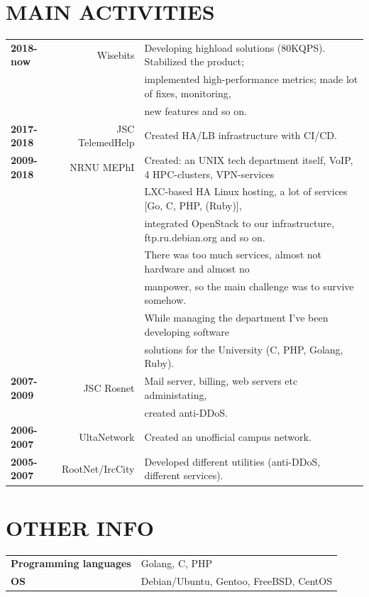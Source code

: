 \begin{resume}
\section{MAIN ACTIVITIES}
\vspace{0.1in} 
\begin{tabular}{lrl}
    {\bf 2018-now}  & Wisebits        & Developing highload solutions (80KQPS). Stabilized the product;\\
                    &                 & implemented high-performance metrics; made lot of fixes, monitoring,\\
                    &                 & new features and so on.\\
    {\bf 2017-2018} & JSC TelemedHelp & Created HA/LB infrastructure with CI/CD.\\
    {\bf 2009-2018} & NRNU MEPhI      & Created: an UNIX tech department itself, VoIP, 4 HPC-clusters, VPN-services\\
                    &                 & LXC-based HA Linux hosting, a lot of services [Go, C, PHP, (Ruby)],\\
                    &                 & integrated OpenStack to our infrastructure, ftp.ru.debian.org and so on.\\
                    &                 & There was too much services, almost not hardware and almost no\\
                    &                 & manpower, so the main challenge was to survive somehow.\\
                    &                 & While managing the department I've been developing software\\
                    &                 & solutions for the University (C, PHP, Golang, Ruby).\\
    {\bf 2007-2009} & JSC Rosnet      & Mail server, billing, web servers etc administating,\\
                    &                 & created anti-DDoS.\\
    {\bf 2006-2007} & UltaNetwork     & Created an unofficial campus network.\\
    {\bf 2005-2007} & RootNet/IrcCity & Developed different utilities (anti-DDoS, different services).\\
\end{tabular}

\section{OTHER INFO}
\vspace{0.1in} 
\begin{tabular}{ll}
{\bf Programming languages} & Golang, C, PHP\\
{\bf OS}                    & Debian/Ubuntu, Gentoo, FreeBSD, CentOS\\
\end{tabular}


\end{resume}
